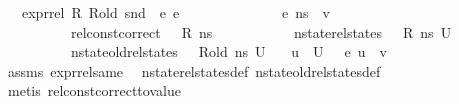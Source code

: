 \begin{isabellebody}
\ \ \ {\isachardoublequoteopen}expr{\isacharunderscore}{\kern0pt}rel\ R\ R{\isacharunderscore}{\kern0pt}old\ {\isacharparenleft}{\kern0pt}snd\ {\isasymLambda}{\isacharparenright}{\kern0pt}\ e{}\ e{}{\isachardoublequoteclose}\ \ \isanewline
\ \ \ \ \ \ \ \ \ \ {\isachardoublequoteopen}{\isasymLambda}{\isacharcomma}{\kern0pt}{\isasymGamma}{\isacharcomma}{\kern0pt}{\isasymOmega}\ {\isasymturnstile}\ {\isasymlangle}e{}{\isacharcomma}{\kern0pt}\ ns{}{\isasymrangle}\ {\isasymDown}\ v{\isachardoublequoteclose}\ \ \isanewline
\ \ \ \ \ \ \ \ \ \ {\isachardoublequoteopen}rel{\isacharunderscore}{\kern0pt}const{\isacharunderscore}{\kern0pt}correct\ {\isasymLambda}\ {\isasymOmega}\ R\ ns{}{\isachardoublequoteclose}\ \isanewline
\ \ \ \ \ \ \ \ \ \ {\isachardoublequoteopen}nstate{\isacharunderscore}{\kern0pt}rel{\isacharunderscore}{\kern0pt}states\ {\isasymLambda}\ {\isasymLambda}{\isacharprime}{\kern0pt}\ R\ ns{}\ U{\isachardoublequoteclose}\ \isanewline
\ \ \ \ \ \ \ \ \ \ {\isachardoublequoteopen}nstate{\isacharunderscore}{\kern0pt}old{\isacharunderscore}{\kern0pt}rel{\isacharunderscore}{\kern0pt}states\ {\isasymLambda}\ {\isasymLambda}{\isacharprime}{\kern0pt}\ R{\isacharunderscore}{\kern0pt}old\ ns{}\ U{\isachardoublequoteclose}\isanewline
\ \ \ {\isachardoublequoteopen}{\isasymforall}u\ {\isasymin}\ U{\isachardot}{\kern0pt}\ {\isasymLambda}{\isacharprime}{\kern0pt}{\isacharcomma}{\kern0pt}{\isasymGamma}{\isacharcomma}{\kern0pt}{\isasymOmega}\ {\isasymturnstile}\ {\isasymlangle}e{}{\isacharcomma}{\kern0pt}\ u{\isasymrangle}\ {\isasymDown}\ v{\isachardoublequoteclose}\isanewline
%
\isadelimproof
\ \ %
\endisadelimproof
%
\isatagproof
{}\isamarkupfalse%
\ assms\ expr{\isacharunderscore}{\kern0pt}rel{\isacharunderscore}{\kern0pt}same{\isacharparenleft}{\kern0pt}{}{\isacharparenright}{\kern0pt}\ \isamarkupfalse%
\ nstate{\isacharunderscore}{\kern0pt}rel{\isacharunderscore}{\kern0pt}states{\isacharunderscore}{\kern0pt}def\ nstate{\isacharunderscore}{\kern0pt}old{\isacharunderscore}{\kern0pt}rel{\isacharunderscore}{\kern0pt}states{\isacharunderscore}{\kern0pt}def\ \ \ \isanewline
\ \ \isamarkupfalse%
\ {\isacharparenleft}{\kern0pt}metis\ rel{\isacharunderscore}{\kern0pt}const{\isacharunderscore}{\kern0pt}correct{\isacharunderscore}{\kern0pt}to{\isacharunderscore}{\kern0pt}value{\isacharparenright}{\kern0pt}%

\end{isabellebody}
